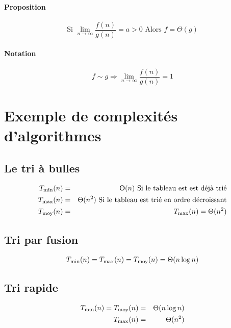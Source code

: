 	\paragraph{Proposition}
	$$\textrm{Si } \lim_{n \rightarrow \infty} \frac{f(n)}{g(n)} = a > 0 \textrm{ Alors }f = \Theta (g)$$

	\paragraph{Notation} $$f \sim g \Rightarrow \lim_{n\rightarrow \infty} \frac{f(n)}{g(n)} = 1$$
	\section{Exemple de complexités d'algorithmes}
	\subsection{Le tri à bulles}
	\begin{eqnarray*}
		T_{\min} (n) &=& \Theta (n) \textrm{ Si le tableau est est déjà trié}\\
		T_{\max}(n) &=& \Theta(n^2) \textrm{ Si le tableau est trié en ordre décroissant}\\
		T_{\moy}(n) &=& T_{\max}(n) = \Theta(n^2)\\
	\end{eqnarray*}
	\subsection{Tri par fusion}
	\begin{eqnarray*}
		T_{\min}(n) = T_{\max}(n) = T_{\moy}(n) = \Theta (n\log n)
	\end{eqnarray*}
	\subsection{Tri rapide}
	\begin{eqnarray*}
		T_{\min}(n) = T_{\moy}(n) &=& \Theta (n \log n)\\
		T_{\max}(n) &=& \Theta(n^2)
	\end{eqnarray*}

